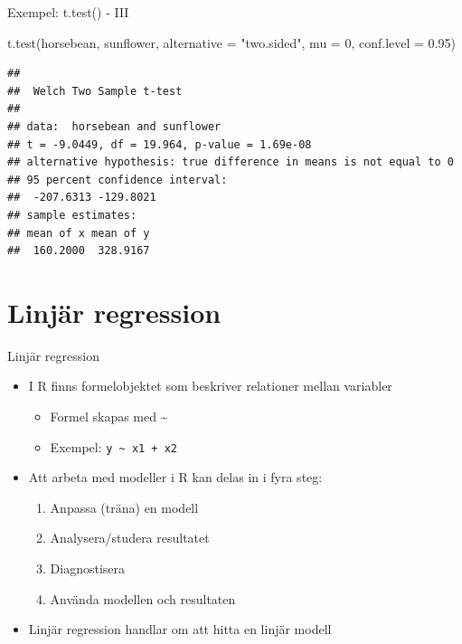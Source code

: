 \documentclass[
  11pt,
  ignorenonframetext,
  handout]{beamer}
\newenvironment{Shaded}{\begin{snugshade}}{\end{snugshade}}
\newcommand{\AttributeTok}[1]{\textcolor[rgb]{0.77,0.63,0.00}{#1}}
\newcommand{\DecValTok}[1]{\textcolor[rgb]{0.00,0.00,0.81}{#1}}
\newcommand{\FloatTok}[1]{\textcolor[rgb]{0.00,0.00,0.81}{#1}}
\newcommand{\FunctionTok}[1]{\textcolor[rgb]{0.00,0.00,0.00}{#1}}
\newcommand{\NormalTok}[1]{#1}
\newcommand{\StringTok}[1]{\textcolor[rgb]{0.31,0.60,0.02}{#1}}
\providecommand{\tightlist}{%
  \setlength{\itemsep}{0pt}\setlength{\parskip}{0pt}}
\begin{document}
\begin{frame}[fragile]{Exempel: t.test() - III}
\protect\hypertarget{exempel-t.test---iii}{}
\begin{Shaded}
\begin{Highlighting}[]
\FunctionTok{t.test}\NormalTok{(horsebean, sunflower,}
       \AttributeTok{alternative =} \StringTok{"two.sided"}\NormalTok{,}
       \AttributeTok{mu =} \DecValTok{0}\NormalTok{, }\AttributeTok{conf.level =} \FloatTok{0.95}\NormalTok{)}
\end{Highlighting}
\end{Shaded}

\begin{verbatim}
## 
##  Welch Two Sample t-test
## 
## data:  horsebean and sunflower
## t = -9.0449, df = 19.964, p-value = 1.69e-08
## alternative hypothesis: true difference in means is not equal to 0
## 95 percent confidence interval:
##  -207.6313 -129.8021
## sample estimates:
## mean of x mean of y 
##  160.2000  328.9167
\end{verbatim}
\end{frame}

\hypertarget{linjuxe4r-regression}{%
\section{Linjär regression}\label{linjuxe4r-regression}}

\begin{frame}[fragile]{Linjär regression}
\protect\hypertarget{linjuxe4r-regression-1}{}
\begin{itemize}
\tightlist
\item
  I R finns formelobjektet som beskriver relationer mellan variabler

  \begin{itemize}
  \tightlist
  \item
    Formel skapas med \textasciitilde{}
  \item
    Exempel: \texttt{y\ \textasciitilde{}\ x1\ +\ x2}
  \end{itemize}
\item
  Att arbeta med modeller i R kan delas in i fyra steg:

  \begin{enumerate}
  \tightlist
  \item
    Anpassa (träna) en modell
  \item
    Analysera/studera resultatet
  \item
    Diagnostisera
  \item
    Använda modellen och resultaten
  \end{enumerate}
\item
  Linjär regression handlar om att hitta en linjär modell
\end{itemize}
\end{frame}
\end{document}
